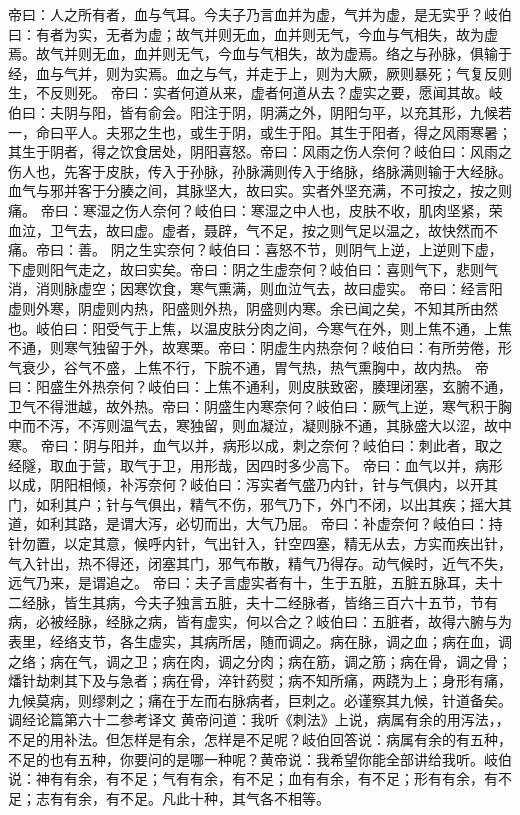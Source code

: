 \documentclass[a4paper,12pt,UTF8,twoside]{ctexbook}
\begin{document}
帝曰：人之所有者，血与气耳。今夫子乃言血并为虚，气并为虚，是无实乎？岐伯曰：有者为实，无者为虚；故气并则无血，血并则无气，今血与气相失，故为虚焉。故气并则无血，血并则无气，今血与气相失，故为虚焉。络之与孙脉，俱输于经，血与气并，则为实焉。血之与气，并走于上，则为大厥，厥则暴死；气复反则生，不反则死。
帝曰：实者何道从来，虚者何道从去？虚实之要，愿闻其故。岐伯曰：夫阴与阳，皆有俞会。阳注于阴，阴满之外，阴阳匀平，以充其形，九候若一，命曰平人。夫邪之生也，或生于阴，或生于阳。其生于阳者，得之风雨寒暑；其生于阴者，得之饮食居处，阴阳喜怒。帝曰：风雨之伤人奈何？岐伯曰：风雨之伤人也，先客于皮肤，传入于孙脉，孙脉满则传入于络脉，络脉满则输于大经脉。血气与邪并客于分腠之间，其脉坚大，故曰实。实者外坚充满，不可按之，按之则痛。
帝曰：寒湿之伤人奈何？岐伯曰：寒湿之中人也，皮肤不收，肌肉坚紧，荣血泣，卫气去，故曰虚。虚者，聂辟，气不足，按之则气足以温之，故快然而不痛。帝曰：善。
阴之生实奈何？岐伯曰：喜怒不节，则阴气上逆，上逆则下虚，下虚则阳气走之，故曰实矣。帝曰：阴之生虚奈何？岐伯曰：喜则气下，悲则气消，消则脉虚空；因寒饮食，寒气熏满，则血泣气去，故曰虚实。
帝曰：经言阳虚则外寒，阴虚则内热，阳盛则外热，阴盛则内寒。余已闻之矣，不知其所由然也。岐伯曰：阳受气于上焦，以温皮肤分肉之间，今寒气在外，则上焦不通，上焦不通，则寒气独留于外，故寒栗。帝曰：阴虚生内热奈何？岐伯曰：有所劳倦，形气衰少，谷气不盛，上焦不行，下脘不通，胃气热，热气熏胸中，故内热。
帝曰：阳盛生外热奈何？岐伯曰：上焦不通利，则皮肤致密，腠理闭塞，玄腑不通，卫气不得泄越，故外热。帝曰：阴盛生内寒奈何？岐伯曰：厥气上逆，寒气积于胸中而不泻，不泻则温气去，寒独留，则血凝泣，凝则脉不通，其脉盛大以涩，故中寒。
帝曰：阴与阳并，血气以并，病形以成，刺之奈何？岐伯曰：刺此者，取之经隧，取血于营，取气于卫，用形哉，因四时多少高下。
帝曰：血气以并，病形以成，阴阳相倾，补泻奈何？岐伯曰：泻实者气盛乃内针，针与气俱内，以开其门，如利其户；针与气俱出，精气不伤，邪气乃下，外门不闭，以出其疾；摇大其道，如利其路，是谓大泻，必切而出，大气乃屈。
帝曰：补虚奈何？岐伯曰：持针勿置，以定其意，候呼内针，气出针入，针空四塞，精无从去，方实而疾出针，气入针出，热不得还，闭塞其门，邪气布散，精气乃得存。动气候时，近气不失，远气乃来，是谓追之。
帝曰：夫子言虚实者有十，生于五脏，五脏五脉耳，夫十二经脉，皆生其病，今夫子独言五脏，夫十二经脉者，皆络三百六十五节，节有病，必被经脉，经脉之病，皆有虚实，何以合之？岐伯曰：五脏者，故得六腑与为表里，经络支节，各生虚实，其病所居，随而调之。病在脉，调之血；病在血，调之络；病在气，调之卫；病在肉，调之分肉；病在筋，调之筋；病在骨，调之骨；燔针劫刺其下及与急者；病在骨，淬针药熨；病不知所痛，两跷为上；身形有痛，九候莫病，则缪刺之；痛在于左而右脉病者，巨刺之。必谨察其九候，针道备矣。
调经论篇第六十二参考译文
黄帝问道：我听《刺法》上说，病属有余的用泻法，，不足的用补法。但怎样是有余，怎样是不足呢？岐伯回答说：病属有余的有五种，不足的也有五种，你要问的是哪一种呢？黄帝说：我希望你能全部讲给我听。岐伯说：神有有余，有不足；气有有余，有不足；血有有余，有不足；形有有余，有不足；志有有余，有不足。凡此十种，其气各不相等。
\end{document}
